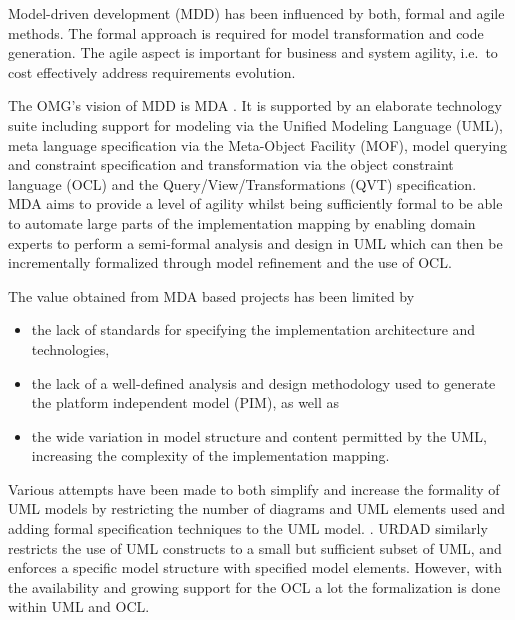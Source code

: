 Model-driven development (MDD)
\cite{stahl:mdsd,france:mddUsingUml2} has been
influenced by both, formal \cite{oquendo:modelDrivenFormalMethod}
and agile \cite{lazar:agileMdaForSoa,solms:generatingMdasPimUsingUrdad}
methods. The formal approach is
required for model transformation and code generation. The agile aspect
is important for business and system agility, i.e.\ to cost effectively
address requirements evolution. 

The OMG's vision of MDD is MDA \cite{siegel:developingInMDA}.
It is supported by an elaborate technology suite including support for modeling
via the Unified Modeling Language (UML), meta language specification via the
Meta-Object Facility (MOF), model querying and constraint specification and
transformation via the object constraint language (OCL) and the 
Query/View/Transformations (QVT) specification. MDA aims to provide a level of agility whilst being
sufficiently formal to be able to automate large parts of the implementation 
mapping 
by enabling domain experts to perform a semi-formal analysis and design
in UML which can then be incrementally formalized through model refinement
and the use of OCL.


The value obtained from MDA based projects has been limited by
\cite{solms:generatingMdasPimUsingUrdad}
\begin{itemize}
  \item the lack of standards for specifying the implementation architecture and technologies,
  \item the lack of a well-defined analysis and design methodology used to generate
the platform independent model (PIM), as well as 
  \item the wide variation in model structure and content permitted by the UML, increasing
the complexity of the implementation mapping.
\end{itemize}

Various attempts have been made to both simplify and increase the formality of UML models by
restricting the number of diagrams and UML elements used and adding formal specification
techniques to the UML model.
\cite{Bruel:integratingFormalAndInformalSpecificationTechniques,mccumber:generalFrameworkForFormalinzingUmlWithFormalLanguages}. 
URDAD similarly restricts the use of UML
constructs to a small but sufficient subset of UML, and enforces a 
specific model structure with specified model elements. 
However, with the availability and growing
support for the OCL a lot the formalization is done within UML and OCL. 

